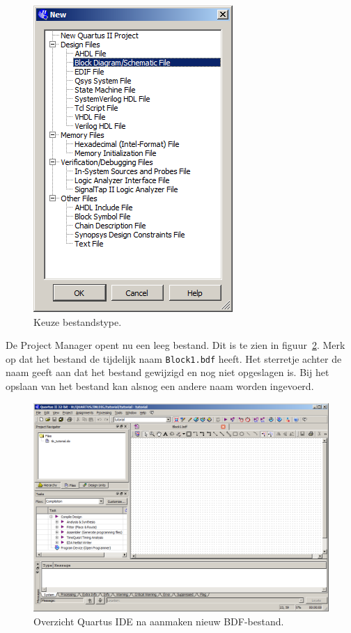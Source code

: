 \documentclass[a4paper,12pt,fleqn,twoside]{book}
\def\tutpicscale{0.455}
\newcommand{\naam}[1]{\texttt{#1}}
\begin{document}
\begin{figure}[H]
\centering
\includegraphics[scale=\tutpicscale]{016selectblockschematic}
\caption{Keuze bestandstype.}
\label{fig:016selectblockschematic}
\end{figure}

De Project Manager opent nu een leeg bestand. Dit is te zien in
figuur~\ref{fig:018screenwithopenblockfile}. Merk op dat het bestand de
tijdelijk naam \naam{Block1.bdf} heeft.
Het sterretje achter de naam geeft aan dat het bestand gewijzigd en nog niet opgeslagen is.
Bij het opslaan van het bestand kan
alsnog een andere naam worden ingevoerd.

\begin{figure}[H]
\centering
\includegraphics[scale=\tutpicscale]{018screenwithopenblockfile}
\caption{Overzicht Quartus IDE na aanmaken nieuw BDF-bestand.}
\label{fig:018screenwithopenblockfile}
\end{figure}
\end{document}
